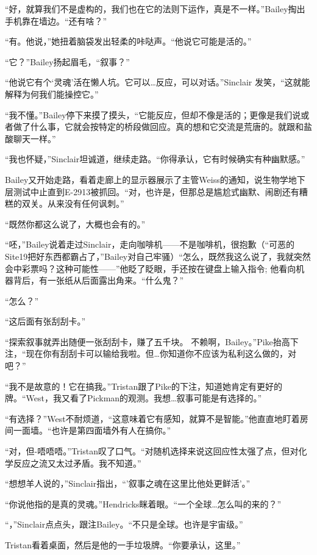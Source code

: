 “好，就算我们不是虚构的，我们也在它的法则下运作，真是不一样。”Bailey掏出手机靠在墙边。“还有啥？”

“有。他说，”她扭着脑袋发出轻柔的咔哒声。“他说它可能是活的。”

“它？”Bailey扬起眉毛，“叙事？”

“他说它有个‘灵魂’活在懒人坑。它可以…反应，可以对话。”Sinclair 发笑，“这就能解释为何我们能操控它。”

“我不懂。”Bailey停下来摸了摸头，“它能反应，但却不像是活的；更像是我们说或者做了什么事，它就会按特定的桥段做回应。真的想和它交流是荒唐的。就跟和盐酸聊天一样。”

“我也怀疑，”Sinclair坦诚道，继续走路。“你得承认，它有时候确实有种幽默感。”

Bailey又开始走路，看着走廊上的显示器展示了主管Weiss的通知，说生物学地下层测试中止直到E-2913被抓回。“对，也许是，但那总是尴尬式幽默、闹剧还有糟糕的双关。从来没有任何讽刺。”

“既然你都这么说了，大概也会有的。”

“呸，”Bailey说着走过Sinclair，走向咖啡机——不是咖啡机，很抱歉（“可恶的Site19把好东西都霸占了，”Bailey对自己牢骚）“怎么，既然我这么说了，我就突然会中彩票吗？这种可能性——”他眨了眨眼，手还按在键盘上输入指令; 他看向机器背后，有一张纸从后面露出角来。“什么鬼？”

“怎么？”

“这后面有张刮刮卡。”

\hr

“探索叙事就弄出随便一张刮刮卡，赚了五千块。 不赖啊，Bailey。”Pike抬高下注，“现在你有刮刮卡可以输给我啦。但…你知道你不应该为私利这么做的，对吧？”

“我不是故意的！它在搞我。”Tristan跟了Pike的下注，知道她肯定有更好的牌。“West，我又看了Pickman的观测。我想…叙事可能是有选择的。”

“有选择？”West不耐烦道，“这意味着它有感知，就算不是智能。”他直直地盯着房间一面墙。“也许是第四面墙外有人在搞你。”

“对，但-唔唔唔。”Tristan叹了口气。“对随机选择来说这回应性太强了点，但对化学反应之流又太过矛盾。我不知道。”

“想想羊人说的，”Sinclair指出，“'叙事之魂在这里比他处更鲜活'。”

“你说他指的是真的灵魂。”Hendricks眯着眼。“一个全球…怎么叫的来的？”

“，”Sinclair点点头，跟注Bailey。“不只是全球。也许是宇宙级。”

Tristan看着桌面，然后是他的一手垃圾牌。“你要承认，这里。”

